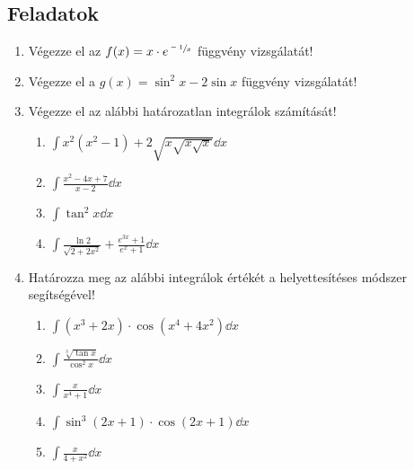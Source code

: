 \documentclass[a4paper, 12pt]{scrartcl}
\begin{document}
\clearpage
\subsection{Feladatok}

\begin{enumerate}
  \item Végezze el az $f(x) = x \cdot e^{\sfrac{-1}{x}}$ függvény vizsgálatát!

  \item Végezze el a $g(x) = \sin^2 x - 2 \sin x$ függvény vizsgálatát!

  \item Végezze el az alábbi határozatlan integrálok számítását!
        \begin{enumerate}
          \item $\displaystyle
                  \int x^2 (x^2 - 1) + 2 \sqrt{x \sqrt{x \sqrt{x}}} \dd x
                $

          \item $\displaystyle
                  \int \frac{x^2 - 4x + 7}{x - 2} \dd x
                $

          \item $\displaystyle
                  \int \tan^2 x \dd x
                $

          \item $\displaystyle
                  \int \frac{\ln 2}{\sqrt{2 + 2x^2}} + \frac{e^{3x} + 1}{e^x + 1} \dd x
                $
        \end{enumerate}

  \item Határozza meg az alábbi integrálok értékét a helyettesítéses módszer
        segítségével!
        \begin{enumerate}
          \item $\displaystyle
                  \int (x^3 + 2x) \cdot \cos\left(x^4 + 4x^2\right) \dd x
                $

          \item $\displaystyle
                  \int \frac{\sqrt[3]{\tan x}}{\cos^2 x} \dd x
                $

          \item $\displaystyle
                  \int \frac{x}{x^4 + 1} \dd x
                $

          \item $\displaystyle
                  \int \sin^3(2x + 1) \cdot \cos(2x + 1) \dd x
                $

          \item $\displaystyle
                  \int \frac{x}{4 + x^2} \dd x
                $


\end{enumerate}
\end{enumerate}
\end{document}
